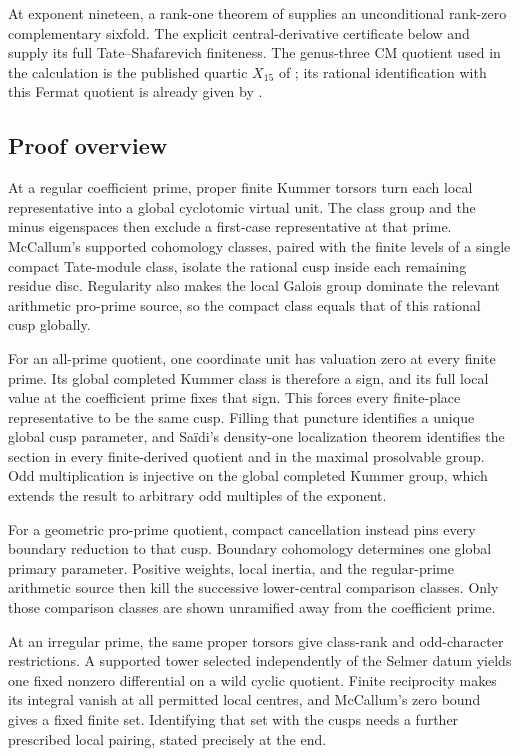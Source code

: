\documentclass[11pt]{article}
\numberwithin{equation}{section}
\theoremstyle{definition}
\begin{document}
At exponent nineteen, a rank-one theorem of
\citet[Theorem~1.6(2), author p.~3]{McCallumTzermias2004} supplies
an unconditional rank-zero complementary sixfold. The explicit
central-derivative certificate below and
\citet[Theorem~A, p.~28]{Zhang2001} supply its full
Tate--Shafarevich finiteness. The genus-three CM quotient used in
the calculation is the published quartic $X_{15}$ of
\citet[author pp.~2 and 22; Table~1, case~15, p.~5]{KilicerEtAl2018};
its rational identification with this Fermat quotient is already given by
\citet[Remark~7.2, p.~12]{Tafazolian2026}.

\subsection{Proof overview}

At a regular coefficient prime, proper finite Kummer torsors turn
each local representative into a global cyclotomic virtual unit.
The class group and the minus eigenspaces then exclude a first-case
representative at that prime. McCallum's supported cohomology classes,
paired with the finite levels of a single compact Tate-module class,
isolate the rational cusp inside each remaining residue disc.
Regularity also makes the local Galois group dominate the relevant
arithmetic pro-prime source, so the compact class equals that of this
rational cusp globally.

For an all-prime quotient, one coordinate unit has valuation zero at
every finite prime. Its global completed Kummer class is therefore
a sign, and its full local value at the coefficient prime fixes that
sign. This forces every finite-place representative to be the same
cusp. Filling that puncture identifies a unique global cusp parameter,
and Sa\"idi's density-one localization theorem identifies the section
in every finite-derived quotient and in the maximal prosolvable group.
Odd multiplication is injective on the global completed Kummer group,
which extends the result to arbitrary odd multiples of the exponent.

For a geometric pro-prime quotient, compact cancellation instead pins
every boundary reduction to that cusp. Boundary cohomology determines
one global primary parameter. Positive weights, local inertia, and
the regular-prime arithmetic source then kill the successive
lower-central comparison classes. Only those comparison classes
are shown unramified away from the coefficient prime.

At an irregular prime, the same proper torsors give class-rank and
odd-character restrictions. A supported tower selected independently
of the Selmer datum yields one fixed nonzero differential on a wild
cyclic quotient. Finite reciprocity makes its integral vanish at all
permitted local centres, and McCallum's zero bound gives a fixed
finite set. Identifying that set with the cusps needs a further
prescribed local pairing, stated precisely at the end.
\end{document}
